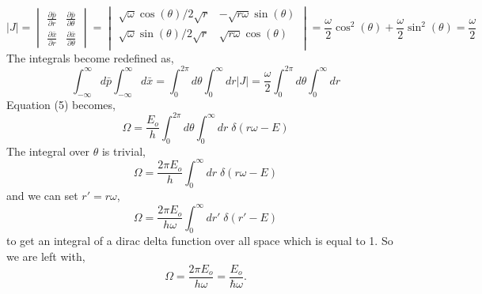 \documentclass{article}
\newcommand{\be}{\begin{equation}}
\newcommand{\ee}{\end{equation}}
\begin{document}
\be
  |J| =
  \begin{vmatrix}
    \frac{\partial \bar{p}}{\partial r} & \frac{\partial \bar{p}}{\partial \theta}\\[6pt]
    \frac{\partial \bar{x}}{\partial r} & \frac{\partial \bar{x}}{\partial \theta}
  \end{vmatrix}
  =
  \begin{vmatrix}
    \sqrt{\omega} \cos(\theta) / 2\sqrt{r} & - \sqrt{r \omega} \sin(\theta) \\
    \sqrt{\omega} \sin(\theta) / 2\sqrt{r} & \sqrt{r \omega} \cos(\theta) \\
  \end{vmatrix}
  = \frac{\omega}{2} \cos^2(\theta) + \frac{\omega}{2} \sin^2(\theta) = \frac{\omega}{2}
\ee
The integrals become redefined as,
\be
  \int_{-\infty}^{\infty} d \bar{p} \int_{-\infty}^{\infty} d\bar{x} = \int_{0}^{2 \pi} d \theta \int_{0}^{\infty} d r |J|  = \frac{\omega}{2} \int_{0}^{2 \pi} d \theta \int_{0}^{\infty} d r
\ee
Equation (5) becomes,
\be
  \Omega = \frac{E_o}{h} \int_{0}^{2 \pi} d \theta \int_{0}^{\infty} d r \; \delta\left( r \omega - E \right)
\ee
The integral over $\theta$ is trivial,
\be
  \Omega = \frac{2 \pi E_o}{h} \int_{0}^{\infty} d r \; \delta\left( r \omega - E \right)
\ee
and we can set $r' = r \omega$,
\be
  \Omega = \frac{2 \pi E_o}{h \omega} \int_{0}^{\infty} d r' \; \delta\left( r' - E \right)
\ee
to get an integral of a dirac delta function over all space which is equal to 1. So we are left with,
\be
  \Omega = \frac{2 \pi E_o}{h \omega} = \frac{E_o}{\hbar \omega} .
\ee
\end{document}
